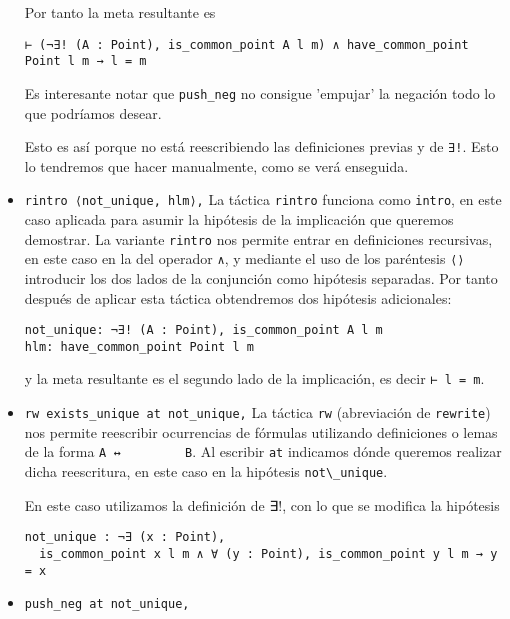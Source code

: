 \begin{itemize}
        Por tanto la meta resultante es 
     \begin{lstlisting}
⊢ (¬∃! (A : Point), is_common_point A l m) ∧ have_common_point Point l m → l = m
     \end{lstlisting}
       Es interesante notar que \lstinline{push_neg} no consigue 'empujar' la negación todo lo que podríamos desear. 
     
        Esto es así porque no está reescribiendo las definiciones previas y de
        \lstinline{∃!}. Esto lo tendremos que hacer manualmente, como se verá enseguida. 

    \item \lstinline{rintro ⟨not_unique, hlm⟩,} La táctica \lstinline{rintro} funciona como
        \lstinline{intro}, en este caso aplicada para asumir la hipótesis de la implicación
        que queremos demostrar. La variante \lstinline{rintro} nos permite entrar en
        definiciones recursivas, en este caso en la del operador \lstinline{∧}, y mediante
        el uso de los paréntesis \lstinline{⟨⟩} introducir los dos lados de la conjunción
        como hipótesis separadas. Por tanto después de aplicar esta táctica
        obtendremos dos hipótesis adicionales:
        \begin{lstlisting}
not_unique: ¬∃! (A : Point), is_common_point A l m
hlm: have_common_point Point l m
        \end{lstlisting}
        y la meta resultante es el segundo lado de la implicación, es decir \lstinline{⊢ l = m}.

    \item \lstinline{rw exists_unique at not_unique,}  La táctica \lstinline{rw}
        (abreviación de \lstinline{rewrite}) nos permite reescribir ocurrencias
        de fórmulas utilizando definiciones o lemas de la forma \lstinline{A ↔
        B}. Al escribir \lstinline{at} indicamos dónde queremos realizar dicha
        reescritura, en este caso en la hipótesis \lstinline{not\_unique}.

        En este caso utilizamos la definición de ∃!, con lo que se modifica la hipótesis
        \begin{lstlisting}
not_unique : ¬∃ (x : Point), 
  is_common_point x l m ∧ ∀ (y : Point), is_common_point y l m → y = x
        \end{lstlisting}

    \item \lstinline{push_neg at not_unique,}


\end{itemize}
